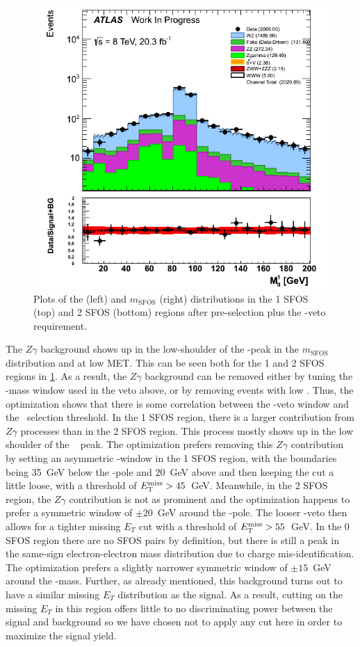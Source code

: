 \begin{figure}[ht!]
\includegraphics[width=0.4\columnwidth]{figures/appendix_signal_selection/Nov24Update_FakeSys_KFacSys_LogY_NoRebin/output/jobs/MxM/DataFull_Rates_May13_FakeRatesExactly2Loose_MuonMxMBJetGt0_ElBJetGt0SubtractPC_MxM/PreselectionNov23_15_2SFOS_ChargeAbs1_BVeto85_physics/weight_all/png/InvariantMassSFOS_histratio.png}
\caption{Plots of the \MET (left) and $m_{\textrm{SFOS}}$ (right) distributions 
in the 1 SFOS (top) and 2 SFOS (bottom) regions after pre-selection
plus the \bee-veto requirement.}
\label{fig:met_zwindow_optimization}
\end{figure}

The $Z\gamma$ background shows up in the low-shoulder of the \z-peak
in the $m_{\textrm{SFOS}}$ distribution and at low MET. This can be
seen both for the 1 and 2 SFOS regions in \fig\ref{fig:met_zwindow_optimization}.
As a result, the $Z\gamma$ background can be removed either by tuning 
the \z-mass window used in the veto above, or by removing events with low \met.
Thus, the optimization shows that there is some correlation 
between the \z-veto window and the \met~selection threshold. 
In the 1 SFOS region, there is a larger 
contribution from $Z\gamma$ processes than in the 2 SFOS
region.  This process mostly shows up in the low shoulder 
of the \z~ peak. The optimization
prefers removing this $Z\gamma$ contribution by setting an 
asymmetric \z-window in the 1 SFOS
region, with the boundaries being 35~GeV below the \z-pole 
and 20~GeV above and then keeping the \MET cut a little loose, with a 
threshold of $E_{\mathrm{T}}^{\mathrm{miss}} > 45$~GeV.  Meanwhile, in the 2 SFOS region,
the $Z\gamma$ contribution is not as prominent and the 
optimization happens to prefer a symmetric
window of $\pm20$~GeV around the \z-pole.  
The looser \z-veto then allows for a tighter
missing $E_{T}$ cut with a threshold of $E_{\mathrm{T}}^{\mathrm{miss}} > 55$~GeV. 
In the 0 SFOS region there 
are no SFOS pairs by definition,
but there is still a peak in the same-sign electron-electron mass 
distribution due to charge mis-identification.
The optimization prefers a slightly narrower symmetric window 
of $\pm15$~GeV around the \z-mass. 
Further, as already mentioned,
this background turns out 
to have a similar missing $E_{T}$ distribution
as the signal. As a result, cutting on the missing $E_{T}$ in this region 
offers little to no discriminating power
between the signal and background so we have chosen not to apply 
any cut here in order to maximize the signal yield.



